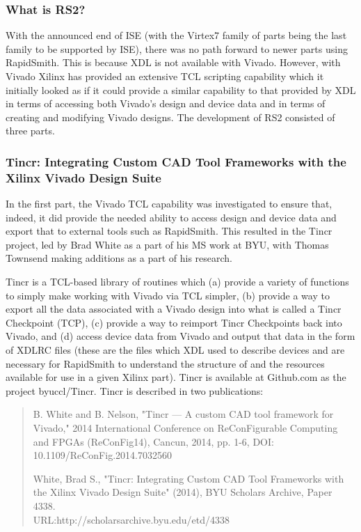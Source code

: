 \documentclass[12pt]{article}
\begin{document}
\subsubsection{What is RS2?}
With the announced end of ISE (with the Virtex7 family of parts being the last
family to be supported by ISE), there was no path forward to newer parts using
RapidSmith.  This is because XDL is not available with Vivado. However, with
Vivado Xilinx has provided an extensive TCL scripting capability which it
initially looked as if it could provide a similar capability to that provided by
XDL in terms of accessing both Vivado’s design and device data and in terms of
creating and modifying Vivado designs.  The development of RS2 consisted of
three parts.

\subsubsection{Tincr: Integrating Custom CAD Tool Frameworks with the Xilinx 
Vivado Design Suite} 

In the first part, the Vivado TCL capability was investigated to ensure that,
indeed, it did provide the needed ability to access design and device data and
export that to external tools such as RapidSmith.  This resulted in the Tincr
project, led by Brad White as a part of his MS work at BYU, with Thomas Townsend
making additions as a part of his research.

Tincr is a TCL-based library of routines which (a) provide a variety of
functions to simply make working with Vivado via TCL simpler, (b) provide a way
to export all the data associated with a Vivado design into what is called a
Tincr Checkpoint (TCP), (c) provide a way to reimport Tincr Checkpoints back
into Vivado, and (d) access device data from Vivado and output that data in the
form of XDLRC files (these are the files which XDL used to describe devices and
are necessary for RapidSmith to understand the structure of and the resources 
available for use in a given Xilinx part).  Tincr is available at Github.com as
the project byuccl/Tincr.  Tincr is described in two publications:

\begin{quotation}B. White and B. Nelson, "Tincr — A custom CAD tool framework
for Vivado," 2014 International Conference on ReConFigurable Computing and FPGAs (ReConFig14),
Cancun, 2014, pp. 1-6, DOI: 10.1109/ReConFig.2014.7032560

White, Brad S., "Tincr: Integrating Custom CAD Tool Frameworks with
the Xilinx Vivado Design Suite" (2014), BYU Scholars Archive, Paper 4338. 
\\URL:http://scholarsarchive.byu.edu/etd/4338
\end{quotation}
\end{document}
